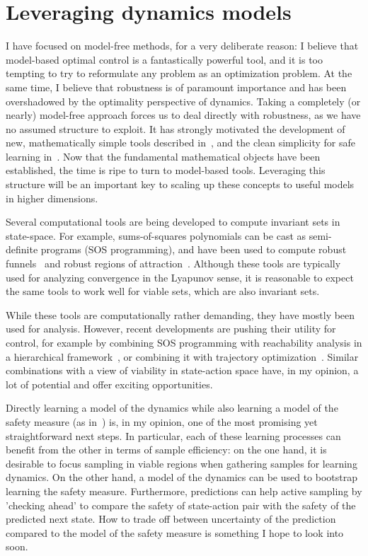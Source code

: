 \section{Leveraging dynamics models} \label{chap:discussion}
I have focused on model-free methods, for a very deliberate reason: I believe that model-based optimal control is a fantastically powerful tool, and it is too tempting to try to reformulate any problem as an optimization problem.
At the same time, I believe that robustness is of paramount importance and has been overshadowed by the optimality perspective of dynamics.
Taking a completely (or nearly) model-free approach forces us to deal directly with robustness, as we have no assumed structure to exploit.
It has strongly motivated the development of new, mathematically simple tools described in~\cite{heim2019beyond}, and the clean simplicity for safe learning in~\cite{heim2019learnable}.
Now that the fundamental mathematical objects have been established, the time is ripe to turn to model-based tools. Leveraging this structure will be an important key to scaling up these concepts to useful models in higher dimensions. \par
Several computational tools are being developed to compute invariant sets in state-space. For example, sums-of-squares polynomials can be cast as semi-definite programs (SOS programming), and have been used to compute robust funnels~\cite{majumdar2013robust} and robust regions of attraction~\cite{valmorbida2014roa_invariants}. Although these tools are typically used for analyzing convergence in the Lyapunov sense, it is reasonable to expect the same tools to work well for viable sets, which are also invariant sets. \par
While these tools are computationally rather demanding, they have mostly been used for analysis. However, recent developments are pushing their utility for control, for example by combining SOS programming with reachability analysis in a hierarchical framework~\cite{singh2018robust}, or combining it with trajectory optimization~\cite{manchester2019robust}. Similar combinations with a view of viability in state-action space have, in my opinion, a lot of potential and offer exciting opportunities. \par
Directly learning a model of the dynamics while also learning a model of the safety measure (as in~\cite{heim2019learnable}) is, in my opinion, one of the most promising yet straightforward next steps. In particular, each of these learning processes can benefit from the other in terms of sample efficiency: on the one hand, it is desirable to focus sampling in viable regions when gathering samples for learning dynamics. On the other hand, a model of the dynamics can be used to bootstrap learning the safety measure. Furthermore, predictions can help active sampling by 'checking ahead' to compare the safety of state-action pair with the safety of the predicted next state. How to trade off between uncertainty of the prediction compared to the model of the safety measure is something I hope to look into soon.